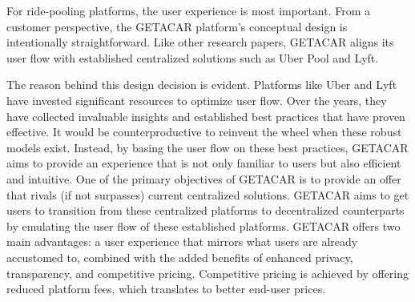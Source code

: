 For ride-pooling platforms, the user experience is most important. From a customer perspective, the GETACAR platform's conceptual design is intentionally straightforward. Like other research papers, GETACAR aligns its user flow with established centralized solutions such as Uber Pool and Lyft.

The reason behind this design decision is evident. Platforms like Uber and Lyft have invested significant resources to optimize user flow. Over the years, they have collected invaluable insights and established best practices that have proven effective. It would be counterproductive to reinvent the wheel when these robust models exist. Instead, by basing the user flow on these best practices, GETACAR aims to provide an experience that is not only familiar to users but also efficient and intuitive. 
One of the primary objectives of GETACAR is to provide an offer that rivals (if not surpasses) current centralized solutions. GETACAR aims to get users to transition from these centralized platforms to decentralized counterparts by emulating the user flow of these established platforms. GETACAR offers two main advantages: a user experience that mirrors what users are already accustomed to, combined with the added benefits of enhanced privacy, transparency, and competitive pricing. Competitive pricing is achieved by offering reduced platform fees, which translates to better end-user prices. 

